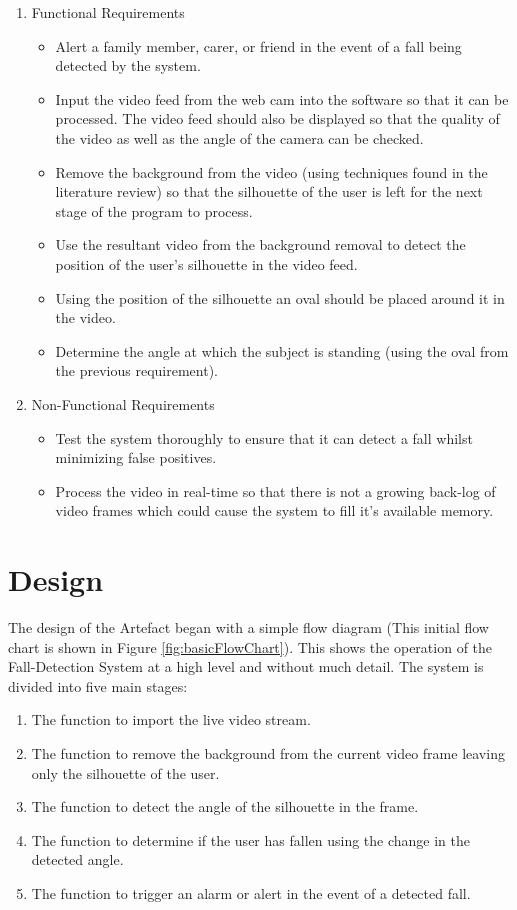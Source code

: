 \documentclass[11pt,a4paper]{report}
\begin{document}
\begin{enumerate}
   \item Functional Requirements
   \begin{itemize}
   	\item Alert a family member, carer, or friend in the event of a fall being detected by the
system.
  \item Input the video feed from the web cam into the software so that it can be processed. The video feed should also be displayed so that the quality of the video as well as the angle of the camera can be checked.
      \item Remove the background from the video (using techniques found in the literature review) so that the silhouette of the user is left for the next stage of the program to process.
      \item Use the resultant video from the background removal to detect the position of the user’s silhouette in the video feed.
      \item Using the position of the silhouette an oval should be placed around it in the video.
      \item Determine the angle at which the subject is standing (using the oval from the previous requirement).
   \end{itemize}
   \item Non-Functional Requirements
    \begin{itemize}
	\item Test the system thoroughly to ensure that it can detect a fall whilst minimizing false positives.
    \item Process the video in real-time so that there is not a growing back-log of video frames which could cause the system to fill it's available memory.
    \end{itemize}
\end{enumerate}

\section{Design}

The design of the Artefact began with a simple flow diagram (This initial flow chart is shown in Figure \ref{fig:basicFlowChart}). This shows the operation of the Fall-Detection System at a high level and without much detail. The system is divided into five main stages:

\begin{enumerate}
	\item The function to import the live video stream.
    \item The function to remove the background from the current video frame leaving only the silhouette of the user.
    \item The function to detect the angle of the silhouette in the frame.
    \item The function to determine if the user has fallen using the change in the detected angle.
    \item The function to trigger an alarm or alert in the event of a detected fall.
\end{enumerate}
\end{document}
